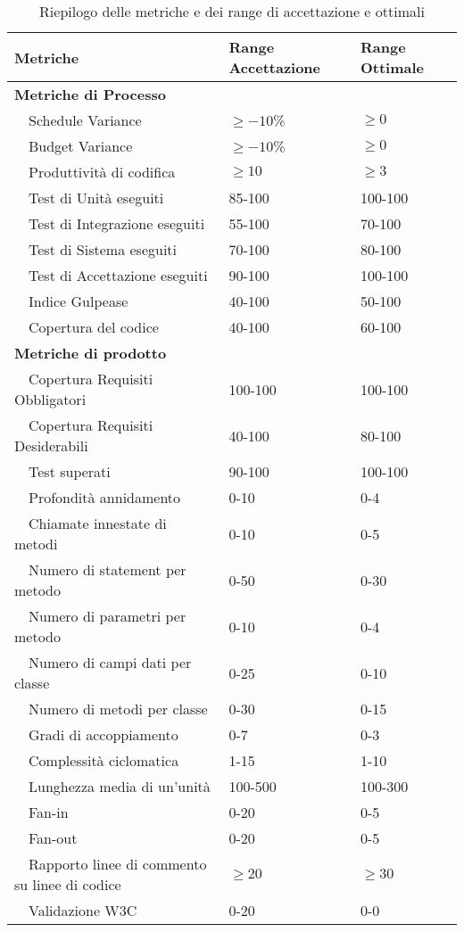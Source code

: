 	\newpage
	\begin{table}
	\begin{tabular}{|l|l|l|}
	\hline
	\textbf{Metriche} 						&\textbf{Range Accettazione} &\textbf{Range Ottimale} \\
	\hline
	\textbf{Metriche di Processo}					&				&\\
	\hline
	~~Schedule Variance 							&$\geq{-10}$\%	&$\geq{0}$\\
	~~Budget Variance 								&$\geq{-10}$\%	&$\geq{0}$\\
	~~Produttività di codifica 						&$\geq{10}$		&$\geq{3}$\\
	~~Test di Unità eseguiti						&85-100			&100-100\\
	~~Test di Integrazione eseguiti					&55-100			&70-100\\
	~~Test di Sistema eseguiti						&70-100			&80-100\\
	~~Test di Accettazione eseguiti					&90-100			&100-100\\
	~~Indice Gulpease								&40-100			&50-100\\
	~~Copertura del codice							&40-100			&60-100\\
	\hline
	\textbf{Metriche di prodotto}					&				&\\
	\hline
	~~Copertura Requisiti Obbligatori				&100-100		&100-100\\
	~~Copertura Requisiti Desiderabili				&40-100			&80-100\\
	~~Test superati									&90-100			&100-100\\
	~~Profondità annidamento						&0-10			&0-4\\
	~~Chiamate innestate di metodi					&0-10			&0-5\\
	~~Numero di statement per metodo				&0-50			&0-30\\
	~~Numero di parametri per metodo				&0-10			&0-4\\
	~~Numero di campi dati per classe				&0-25			&0-10\\
	~~Numero di metodi per classe					&0-30			&0-15\\
	~~Gradi di accoppiamento						&0-7			&0-3\\
	~~Complessità ciclomatica						&1-15			&1-10\\
	~~Lunghezza media di un'unità					&100-500		&100-300\\
	~~Fan-in										&0-20			&0-5\\
	~~Fan-out										&0-20			&0-5\\
	~~Rapporto linee di commento su linee di codice	&$\geq{20}$		&$\geq{30}$\\
	~~Validazione W3C								&0-20			&0-0\\
	\hline
	\end{tabular}
	\caption{Riepilogo delle metriche e dei range di accettazione e ottimali}
	\end{table}
	
